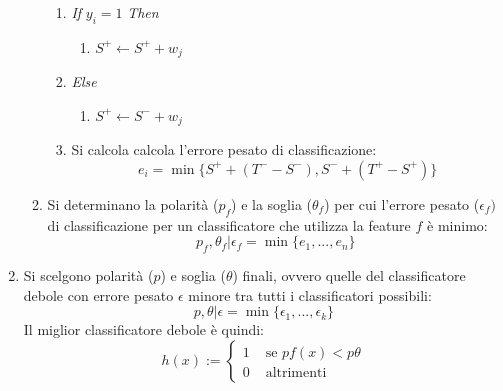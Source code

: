 \begin{enumerate}
\begin{enumerate}
\begin{enumerate}
                        \item \emph{If} $y_i = 1$ \emph{Then}
                        \begin{enumerate}
                            \item $S^+ \leftarrow S^+ + w_j$
                        \end{enumerate}
                        \item \emph{Else}
                        \begin{enumerate}
                            \item $S^+ \leftarrow S^- + w_j$
                        \end{enumerate}

                        \item \label{best_classifier_p_theta}
                        Si calcola calcola l'errore pesato di classificazione:
                        $$e_i = \min\{ S^+ + (T^- - S^-), S^- + (T^+ - S^+) \}$$

                    \end{enumerate}

                    \item Si determinano la polarità ($p_f$) e la soglia ($\theta_f$) per cui l'errore pesato ($\epsilon_f)$ di classificazione per un classificatore che utilizza la feature $f$ è minimo:
                    $$p_f, \theta_f | \epsilon_f = \min \{ e_1, ..., e_n \}$$
                \end{enumerate}

                \item Si scelgono polarità ($p$) e soglia ($\theta$) finali, ovvero quelle del classificatore debole con errore pesato $\epsilon$ minore tra tutti i classificatori possibili:
                $$p, \theta | \epsilon = \min \{ \epsilon_1, ..., \epsilon_k \}$$
                Il miglior classificatore debole è quindi:
                \begin{equation}
                    \label{eq:weak_classifier}
                    h(x) := \begin{cases}
                    1 & \text{ se } pf(x) < p\theta \\
                    0 & \text{ altrimenti }
                \end{cases}
            \end{equation}

            \end{enumerate}

